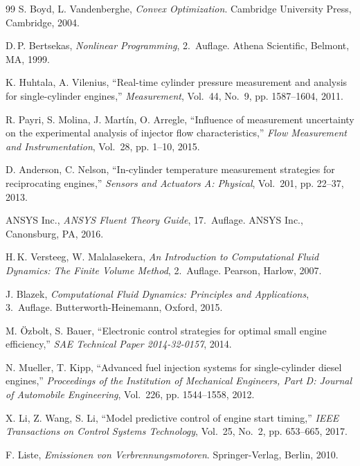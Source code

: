 ﻿\documentclass[a4paper,12pt]{article}
\begin{document}
\begin{thebibliography}{99}
	S. Boyd, L. Vandenberghe,
	\textit{Convex Optimization}.
	Cambridge University Press, Cambridge, 2004.
	
	D.\,P. Bertsekas,
	\textit{Nonlinear Programming}, 2.~Auflage.
	Athena Scientific, Belmont, MA, 1999.
	
	K. Huhtala, A. Vilenius,
	``Real-time cylinder pressure measurement and analysis for single-cylinder engines,''
	\textit{Measurement}, Vol.~44, No.~9, pp. 1587--1604, 2011.
	
	R. Payri, S. Molina, J. Martín, O. Arregle,
	``Influence of measurement uncertainty on the experimental analysis of injector flow characteristics,''
	\textit{Flow Measurement and Instrumentation}, Vol.~28, pp. 1--10, 2015.
	
	D. Anderson, C. Nelson,
	``In-cylinder temperature measurement strategies for reciprocating engines,''
	\textit{Sensors and Actuators A: Physical}, Vol.~201, pp. 22--37, 2013.
	
	ANSYS Inc.,
	\textit{ANSYS Fluent Theory Guide}, 17.~Auflage.
	ANSYS Inc., Canonsburg, PA, 2016.
	
	H.\,K. Versteeg, W. Malalasekera,
	\textit{An Introduction to Computational Fluid Dynamics: The Finite Volume Method}, 2.~Auflage.
	Pearson, Harlow, 2007.
	
	J. Blazek,
	\textit{Computational Fluid Dynamics: Principles and Applications}, 3.~Auflage.
	Butterworth-Heinemann, Oxford, 2015.
	
	M. Özbolt, S. Bauer,
	``Electronic control strategies for optimal small engine efficiency,''
	\textit{SAE Technical Paper 2014-32-0157}, 2014.
	
	N. Mueller, T. Kipp,
	``Advanced fuel injection systems for single-cylinder diesel engines,''
	\textit{Proceedings of the Institution of Mechanical Engineers, Part D: Journal of Automobile Engineering}, Vol.~226, pp. 1544--1558, 2012.
	
	X. Li, Z. Wang, S. Li,
	``Model predictive control of engine start timing,''
	\textit{IEEE Transactions on Control Systems Technology}, Vol.~25, No.~2, pp. 653--665, 2017.
	
	F. Liste,
	\textit{Emissionen von Verbrennungsmotoren}.
	Springer-Verlag, Berlin, 2010.
	

\end{thebibliography}
\end{document}
